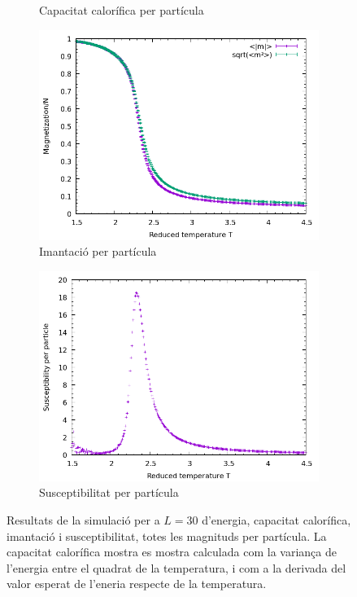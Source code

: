 \documentclass[a4paper]{article}
\begin{document}
\begin{figure}[H]
\begin{subfigure}{.45\textwidth}
        \caption{Capacitat calorífica per partícula}
        \label{fig:props-cv}
    \end{subfigure}
        \begin{subfigure}{.45\textwidth}
        \centering
        \includegraphics[width=\textwidth]{props-L-030_m.png}
        \caption{Imantació per partícula}
        \label{fig:props-m}
    \end{subfigure}
    \begin{subfigure}{.45\textwidth}
        \centering
        \includegraphics[width=\textwidth]{props-L-030_xn.png}
        \caption{Susceptibilitat per partícula}
        \label{fig:props-x}
    \end{subfigure}
    \caption{Resultats de la simulació per a $L=30$ d'energia, capacitat calorífica, imantació i susceptibilitat, totes les magnituds per partícula. La capacitat calorífica mostra es mostra calculada com la variança de l'energia entre el quadrat de la temperatura, i com a la derivada del valor esperat de l'eneria respecte de la temperatura.}
\label{fig:props}
\end{figure}
\end{document}
